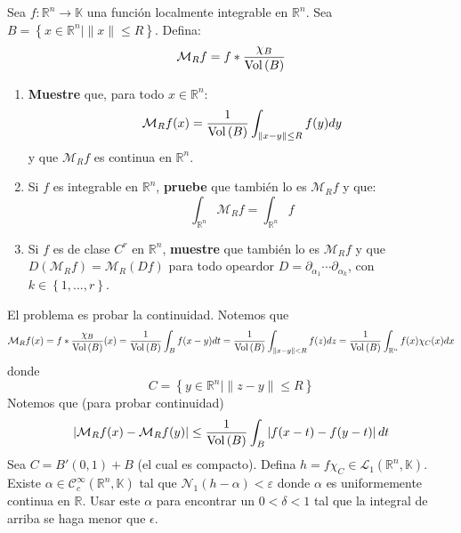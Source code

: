 \documentclass[12pt]{report}
\theoremstyle{largebreak}
\newcommand\abs[1]{\ensuremath{\left|#1\right|}}
\newcommand\cf[3]{\ensuremath{#1:#2\rightarrow#3}}
\newcommand{\Vol}[1]{\ensuremath{\textup{Vol}\left(#1\right)}}
\newcommand{\N}[2]{\ensuremath{\mathcal{N}_{#1}\left(#2\right)}}
\begin{document}
    \begin{excer}
        Sea $\cf{f}{\mathbb{R}^n}{\mathbb{K}}$ una función localmente integrable en $\mathbb{R}^n$. Sea $B=\left\{x\in\mathbb{R}^n\Big|\|x\|\leq R \right\}$. Defina:
        \begin{equation*}
            \mathcal{M}_Rf=f*\frac{\chi_B}{\Vol{B}}
        \end{equation*}
        \begin{enumerate}
            \item \textbf{Muestre} que, para todo $x\in\mathbb{R}^n$:
            \begin{equation*}
                \mathcal{M}_Rf(x)=\frac{1}{\Vol{B}}\int_{\|x-y\|\leq R}f(y)dy
            \end{equation*}
            y que $\mathcal{M}_Rf$ es continua en $\mathbb{R}^n$.
            \item Si $f$ es integrable en $\mathbb{R}^n$, \textbf{pruebe} que también lo es $\mathcal{M}_Rf$ y que:
            \begin{equation*}
                \int_{\mathbb{R}^n}\mathcal{M}_Rf=\int_{\mathbb{R}^n}f
            \end{equation*}
            \item Si $f$ es de clase $C^r$ en $\mathbb{R}^n$, \textbf{muestre} que también lo es $\mathcal{M}_Rf$ y que $D(\mathcal{M}_Rf)=\mathcal{M}_R(Df)$ para todo opeardor $D=\partial_{\alpha_1}\cdots\partial_{\alpha_k}$, con $k\in\left\{1,...,r \right\}$.
        \end{enumerate}
    \end{excer}
    
    \begin{sol}
        El problema es probar la continuidad. Notemos que
        \begin{equation*}
            \mathcal{M}_Rf(x)=f*\frac{\chi_B}{\Vol{B}}(x)=\frac{1}{\Vol{B}}\int_Bf(x-y)dt=\frac{1}{\Vol{B}}\int_{\|x-y\|<R}f(z)dz=\frac{1}{\Vol{B}}\int_{\mathbb{R}^n}f(x)\chi_C(x)dx
        \end{equation*}
        donde
        \begin{equation*}
            C=\left\{y\in\mathbb{R}^n\Big|\|z-y\|\leq R \right\}
        \end{equation*}
        Notemos que (para probar continuidad)
        \begin{equation*}
            \abs{\mathcal{M}_Rf(x)-\mathcal{M}_Rf(y)}\leq\frac{1}{\Vol{B}}\int_B\abs{f(x-t)-f(y-t)}dt
        \end{equation*}
        Sea $C=B'(0,1)+B$ (el cual es compacto). Defina $h=f\chi_C\in\mathcal{L}_1(\mathbb{R}^n,\mathbb{K})$. Existe $\alpha\in\mathcal{C}^\infty_c(\mathbb{R}^n,\mathbb{K})$ tal que $\N{1}{h-\alpha}<\varepsilon$ donde $\alpha$ es uniformemente continua en $\mathbb{R}$. Usar este $\alpha$ para encontrar un $0<\delta<1$ tal que la integral de arriba se haga menor que $\epsilon$.
    \end{sol}
\end{document}
